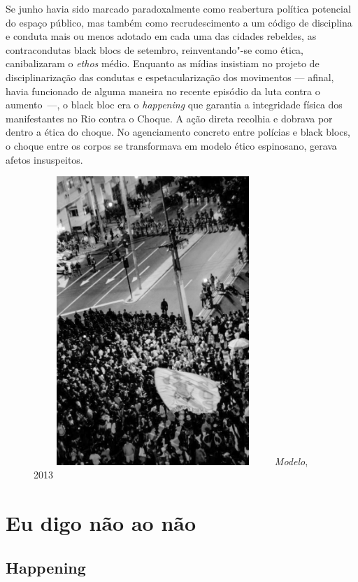 Se junho havia sido marcado paradoxalmente como reabertura política
potencial do espaço público, mas também como recrudescimento a um código
de disciplina e conduta mais ou menos adotado em cada uma das cidades
rebeldes, as contracondutas black blocs de setembro, reinventando"-se
como ética, canibalizaram o \emph{ethos} médio. Enquanto as mídias
insistiam no projeto de disciplinarização das condutas e
espetacularização dos movimentos --- afinal, havia funcionado de alguma
maneira no recente episódio da luta contra o aumento~---, o black bloc
era o \emph{happening }que garantia a integridade física dos
manifestantes no Rio contra o Choque. A ação direta recolhia e dobrava
por dentro a ética do choque. No agenciamento concreto entre polícias e
black blocs, o choque entre os corpos se transformava em modelo ético
espinosano, gerava afetos insuspeitos.

\begin{figure}[h]
\centering
\includegraphics[width=9cm,height=10.92cm]{Imgs/img11.jpg}
\emph{Modelo}, 2013
\end{figure}

\section{Eu digo não ao não}

\subsection{Happening}

